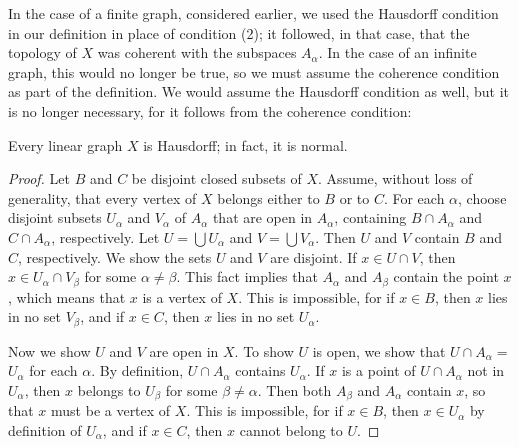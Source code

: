 In the case of a finite graph, considered earlier, we used the Hausdorff condition in our definition in place of condition (2); it followed, in that case, that the topology of \(X\) was coherent with the subspaces \(A_{\alpha }\). In the case of an infinite graph, this would no longer be true, so we must assume the coherence condition as part of the definition. We would assume the Hausdorff condition as well, but it is no longer necessary, for it follows from the coherence condition:

\begin{lemma}
\label{lem:\thetheorem}
Every linear graph \(X\) is Hausdorff; in fact, it is normal.
\end{lemma}

\begin{proof}
	Let \(B\) and \(C\) be disjoint closed subsets of \(X\). Assume, without loss of generality, that every vertex of \(X\) belongs either to \(B\) or to \(C\). For each \(\alpha\), choose disjoint subsets \(U_{\alpha }\) and \(V_{\alpha }\) of \(A_{\alpha }\) that are open in \(A_{\alpha }\), containing \(B \cap {A}_{\alpha }\) and \(C \cap {A}_{\alpha }\), respectively. Let \(U = \bigcup {U}_{\alpha }\) and \(V = \bigcup {V}_{\alpha }\). Then \(U\) and \(V\) contain \(B\) and \(C\), respectively.
We show the sets \(U\) and \(V\) are disjoint. If \(x \in U \cap V\), then \(x \in {U}_{\alpha } \cap {V}_{\beta }\) for some \(\alpha \neq \beta\). This fact implies that \(A_{\alpha }\) and \(A_{\beta }\) contain the point \(x\), which means that \(x\) is a vertex of \(X\). This is impossible, for if \(x \in B\), then \(x\) lies in no set \(V_{\beta }\), and if \(x \in C\), then \(x\) lies in no set \(U_{\alpha }\).

Now we show \(U\) and \(V\) are open in \(X\). To show \(U\) is open, we show that \(U \cap {A}_{\alpha } =\) \(U_{\alpha }\) for each \(\alpha\). By definition, \(U \cap {A}_{\alpha }\) contains \(U_{\alpha }\). If \(x\) is a point of \(U \cap {A}_{\alpha }\) not in \(U_{\alpha }\), then \(x\) belongs to \(U_{\beta }\) for some \(\beta \neq \alpha\). Then both \(A_{\beta }\) and \(A_{\alpha }\) contain \(x\), so that \(x\) must be a vertex of \(X\). This is impossible, for if \(x \in B\), then \(x \in {U}_{\alpha }\) by definition of \(U_{\alpha }\), and if \(x \in C\), then \(x\) cannot belong to \(U\).
\end{proof}

